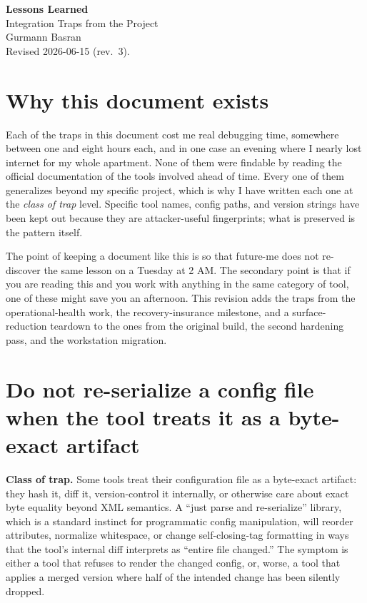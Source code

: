 \documentclass[12pt]{article}
\begin{document}
\begin{center}
{\LARGE\textbf{Lessons Learned}}\\[4pt]
{\large Integration Traps from the Project}\\[6pt]
Gurmann Basran\\
\small Revised 2026-06-15 (rev.\ 3).
\end{center}

\section{Why this document exists}

Each of the traps in this document cost me real debugging time, somewhere between one and eight hours each, and in one case an evening where I nearly lost internet for my whole apartment. None of them were findable by reading the official documentation of the tools involved ahead of time. Every one of them generalizes beyond my specific project, which is why I have written each one at the \emph{class of trap} level. Specific tool names, config paths, and version strings have been kept out because they are attacker-useful fingerprints; what is preserved is the pattern itself.

The point of keeping a document like this is so that future-me does not re-discover the same lesson on a Tuesday at 2 AM. The secondary point is that if you are reading this and you work with anything in the same category of tool, one of these might save you an afternoon. This revision adds the traps from the operational-health work, the recovery-insurance milestone, and a surface-reduction teardown to the ones from the original build, the second hardening pass, and the workstation migration.

\section{Do not re-serialize a config file when the tool treats it as a byte-exact artifact}

\textbf{Class of trap.} Some tools treat their configuration file as a byte-exact artifact: they hash it, diff it, version-control it internally, or otherwise care about exact byte equality beyond XML semantics. A ``just parse and re-serialize'' library, which is a standard instinct for programmatic config manipulation, will reorder attributes, normalize whitespace, or change self-closing-tag formatting in ways that the tool's internal diff interprets as ``entire file changed.'' The symptom is either a tool that refuses to render the changed config, or, worse, a tool that applies a merged version where half of the intended change has been silently dropped.
\end{document}
